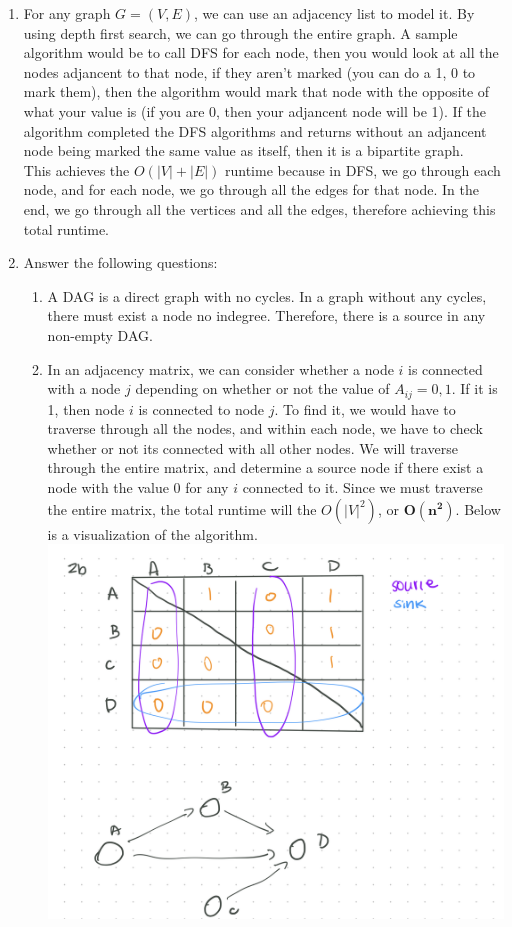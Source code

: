 \documentclass{article}
\begin{document}
    \begin{enumerate}
        \item For any graph $G = (V,E)$, we can use an adjacency list to model it. By using depth first search, we can go through the entire graph. A sample algorithm would be to call DFS for each node, then you would look at all the nodes adjancent to that node, if they aren't marked (you can do a 1, 0 to mark them), then the algorithm would mark that node with the opposite of what your value is (if you are 0, then your adjancent node will be 1). If the algorithm completed the DFS algorithms and returns without an adjancent node being marked the same value as itself, then it is a bipartite graph.\\
        This achieves the $O(|V| + |E|)$ runtime because in DFS, we go through each node, and for each node, we go through all the edges for that node. In the end, we go through all the vertices and all the edges, therefore achieving this total runtime.
        \item Answer the following questions:
        \begin{enumerate}
            \item A DAG is a direct graph with no cycles. In a graph without any cycles, there must exist a node no indegree. Therefore, there is a source in any non-empty DAG.
            \item In an adjacency matrix, we can consider whether a node $i$ is connected with a node $j$ depending on whether or not the value of $A_{ij} = 0,1$. If it is 1, then node $i$ is connected to node $j$. To find it, we would have to traverse through all the nodes, and within each node, we have to check whether or not its connected with all other nodes. We will traverse through the entire matrix, and determine a source node if there exist a node with the value $0$ for any $i$ connected to it. Since we must traverse the entire matrix, the total runtime will the $O(|V|^2)$, or $\boxed{\mathbf{O(n^2)}}$. Below is a visualization of the algorithm.
            \includegraphics[scale=0.35]{2b.png}

\end{enumerate}
\end{enumerate}
\end{document}
